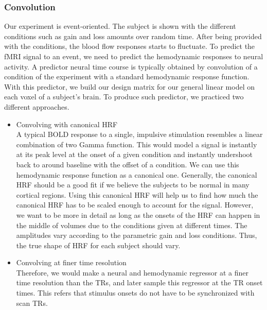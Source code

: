 \subsubsection {Convolution}
Our experiment is event-oriented. The subject is shown with the different conditions such as gain and loss amounts over random time. After being provided with the conditions, the blood flow responses starts to fluctuate. To predict the fMRI signal to an event, we need to predict the hemodynamic responses to neural activity. A predictor neural time course is typically obtained by convolution of a condition of the experiment with a standard hemodynamic response function. With this predictor, we build our design matrix for our general linear model on each voxel of a subject's brain. To produce such predictor, we practiced two different approaches.
\begin{itemize}
\item  Convolving with canonical HRF \\
A typical BOLD response to a single, impulsive stimulation resembles a linear combination of two Gamma function. This would model a signal is instantly at its peak level at the onset of a given condition and instantly undershoot back to around baseline with the offset of a condition. We can use this hemodynamic response function as a canonical one. Generally, the canonical HRF should be a good fit if we believe the subjects to be normal in many cortical regions. Using this canonical HRF will help us to find how much the canonical HRF has to be scaled enough to account for the signal. However, we want to be more in detail as long as the onsets of the HRF can happen in the middle of volumes due to the conditions given at different times. The amplitudes vary according to the parametric gain and loss conditions. Thus, the true shape of HRF for each subject should vary.


\item  Convolving at finer time resolution \\
Therefore, we would make a neural and hemodynamic regressor at a finer time resolution than the TRs, and later sample this regressor at the TR onset times. This refers that stimulus onsets do not have to be synchronized with scan TRs.
\end {itemize}


